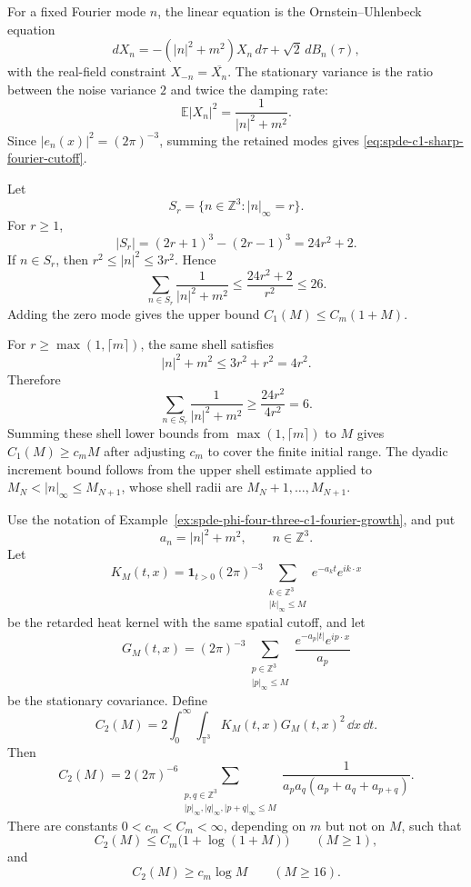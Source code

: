 For a fixed Fourier mode \(n\), the linear equation is the
Ornstein--Uhlenbeck equation
\[
  dX_n=-(|n|^2+m^2)X_n\,d\tau+\sqrt2\,dB_n(\tau),
\]
with the real-field constraint \(X_{-n}=\overline{X_n}\).  The stationary
variance is the ratio between the noise variance \(2\) and twice the damping
rate:
\[
  \mathbb E|X_n|^2=\frac{1}{|n|^2+m^2}.
\]
Since \(|e_n(x)|^2=(2\pi)^{-3}\), summing the retained modes gives
\eqref{eq:spde-c1-sharp-fourier-cutoff}.

Let
\[
  S_r=\{n\in\mathbb Z^3:|n|_\infty=r\}.
\]
For \(r\geq1\),
\[
  |S_r|=(2r+1)^3-(2r-1)^3=24r^2+2 .
\]
If \(n\in S_r\), then \(r^2\leq |n|^2\leq3r^2\).  Hence
\[
  \sum_{n\in S_r}\frac{1}{|n|^2+m^2}
  \leq
  \frac{24r^2+2}{r^2}
  \leq 26 .
\]
Adding the zero mode gives the upper bound \(C_1(M)\leq C_m(1+M)\).

For \(r\geq\max(1,\lceil m\rceil)\), the same shell satisfies
\[
  |n|^2+m^2\leq 3r^2+r^2=4r^2 .
\]
Therefore
\[
  \sum_{n\in S_r}\frac{1}{|n|^2+m^2}
  \geq
  \frac{24r^2}{4r^2}
  =
  6 .
\]
Summing these shell lower bounds from
\(\max(1,\lceil m\rceil)\) to \(M\) gives \(C_1(M)\geq c_mM\) after
adjusting \(c_m\) to cover the finite initial range.  The dyadic increment
bound follows from the upper shell estimate applied to
\(M_N<|n|_\infty\leq M_{N+1}\), whose shell radii are
\(M_N+1,\ldots,M_{N+1}\).

\begin{lemma}
\label{lem:spde-phi-four-three-c2-fourier-log-growth}
Use the notation of
Example~\ref{ex:spde-phi-four-three-c1-fourier-growth}, and put
\[
  a_n=|n|^2+m^2,\qquad n\in\mathbb Z^3 .
\]
Let
\[
  K_M(t,x)
  =
  \mathbf 1_{t>0}(2\pi)^{-3}
  \sum_{\substack{k\in\mathbb Z^3\\ |k|_\infty\leq M}}
  e^{-a_kt}e^{ik\cdot x}
\]
be the retarded heat kernel with the same spatial cutoff, and let
\[
  G_M(t,x)
  =
  (2\pi)^{-3}
  \sum_{\substack{p\in\mathbb Z^3\\ |p|_\infty\leq M}}
  \frac{e^{-a_p|t|}e^{ip\cdot x}}{a_p}
\]
be the stationary covariance.  Define
\begin{equation}
  C_2(M)
  =
  2\int_0^\infty\int_{\mathbb T^3}
  K_M(t,x)G_M(t,x)^2\,\dd x\,\dd t .
  \label{eq:spde-c2-fourier-cutoff-integral}
\end{equation}
Then
\begin{equation}
  C_2(M)
  =
  2(2\pi)^{-6}
  \sum_{\substack{p,q\in\mathbb Z^3\\
                  |p|_\infty,|q|_\infty,|p+q|_\infty\leq M}}
  \frac{1}{a_pa_q(a_p+a_q+a_{p+q})}.
  \label{eq:spde-c2-fourier-cutoff-sum}
\end{equation}
There are constants \(0<c_m<C_m<\infty\), depending on \(m\) but not on
\(M\), such that
\[
  C_2(M)\leq C_m\bigl(1+\log(1+M)\bigr)
  \qquad(M\geq1),
\]
and
\[
  C_2(M)\geq c_m\log M
  \qquad(M\geq16).
\]
\end{lemma}

